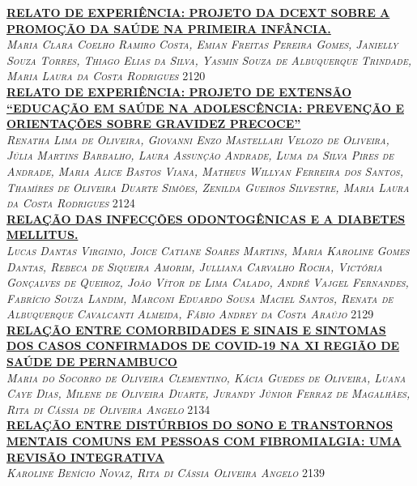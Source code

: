 \noindent \textsc{\hyperlink{trabalhos/250105.pdf.1}{\textbf{RELATO DE EXPERIÊNCIA: PROJETO DA DCEXT SOBRE A PROMOÇÃO DA SAÚDE NA PRIMEIRA INFÂNCIA.}}}\\ 
\noindent \textsc{\textit{Maria Clara Coelho Ramiro Costa, Emian Freitas Pereira Gomes, Janielly Souza Torres, Thiago Elias da Silva, Yasmin Souza de Albuquerque Trindade, Maria Laura da Costa Rodrigues}} \hfill 2120\\ 

\noindent \textsc{\hyperlink{trabalhos/250128.pdf.1}{\textbf{RELATO DE EXPERIÊNCIA: PROJETO DE EXTENSÃO “EDUCAÇÃO EM SAÚDE NA ADOLESCÊNCIA: PREVENÇÃO E ORIENTAÇÕES SOBRE GRAVIDEZ PRECOCE”}}}\\ 
\noindent \textsc{\textit{Renatha Lima de Oliveira, Giovanni Enzo Mastellari Velozo de Oliveira, Júlia Martins Barbalho, Laura Assunção Andrade, Luma da Silva Pires de Andrade, Maria Alice Bastos Viana, Matheus Willyan Ferreira dos Santos, Thamíres de Oliveira Duarte Simões, Zenilda Gueiros Silvestre, Maria Laura da Costa Rodrigues}} \hfill 2124\\ 

\noindent \textsc{\hyperlink{trabalhos/249158.pdf.1}{\textbf{RELAÇÃO DAS INFECÇÕES ODONTOGÊNICAS E A DIABETES MELLITUS.}}}\\ 
\noindent \textsc{\textit{Lucas Dantas Virginio, Joice Catiane Soares Martins, Maria Karoline Gomes Dantas, Rebeca de Siqueira Amorim, Julliana Carvalho Rocha, Victória Gonçalves de Queiroz, João Vítor de Lima Calado, André Vajgel Fernandes, Fabrício Souza Landim, Marconi Eduardo Sousa Maciel Santos, Renata de Albuquerque Cavalcanti Almeida, Fábio Andrey da Costa Araújo}} \hfill 2129\\ 

\noindent \textsc{\hyperlink{trabalhos/251656.pdf.1}{\textbf{RELAÇÃO ENTRE COMORBIDADES E SINAIS E SINTOMAS DOS CASOS CONFIRMADOS DE COVID-19 NA XI REGIÃO DE SAÚDE DE PERNAMBUCO}}}\\ 
\noindent \textsc{\textit{Maria do Socorro de Oliveira Clementino, Kácia Guedes de Oliveira, Luana Caye Dias, Milene de Oliveira Duarte, Jurandy Júnior Ferraz de Magalhães, Rita di Cássia de Oliveira Angelo}} \hfill 2134\\ 

\noindent \textsc{\hyperlink{trabalhos/251767.pdf.1}{\textbf{RELAÇÃO ENTRE DISTÚRBIOS DO SONO E TRANSTORNOS MENTAIS COMUNS EM PESSOAS COM FIBROMIALGIA: UMA REVISÃO INTEGRATIVA}}}\\ 
\noindent \textsc{\textit{Karoline Benício Novaz, Rita di Cássia Oliveira Angelo}} \hfill 2139\\ 

